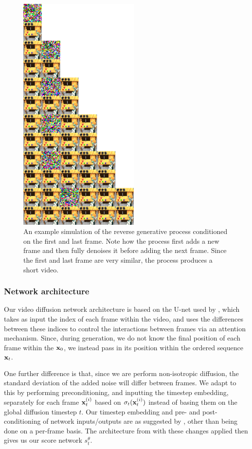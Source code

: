 \begin{figure}
    \centering
    \includegraphics[width=6cm]{figs/tddm/short-obs-32.png}
    \caption{An example simulation of the reverse generative process conditioned on the first and last frame. Note how the process first adds a new frame and then fully denoises it before adding the next frame. Since the first and last frame are very similar, the process produces a short video.}
    \label{fig:tddm-examplevideoreverse}
\end{figure}




\subsubsection{Network architecture}
Our video diffusion network architecture is based on the U-net used by \citet{harvey2022flexible}, which takes as input the index of each frame within the video, and uses the differences between these indices to control the interactions between frames via an attention mechanism. Since, during generation, we do not know the final position of each frame within the ${\mathbf{x}}_0$, we instead pass in its position within the ordered sequence ${\mathbf{x}}_t$.

One further difference is that, since we are perform non-isotropic diffusion, the standard deviation of the added noise will differ between frames. We adapt to this by performing preconditioning, and inputting the timestep embedding, separately for each frame ${\mathbf{x}}_t^{(i)}$ based on $\sigma_t({\mathbf{x}}_t^{(i)})$ instead of basing them on the global diffusion timestep $t$. Our timestep embedding and pre- and post-conditioning of network inputs/outputs are as suggested by \citet{karras2022elucidating}, other than being done on a per-frame basis. The architecture from \citet{harvey2022flexible} with these changes applied then gives us our score network $s_t^\theta$.

